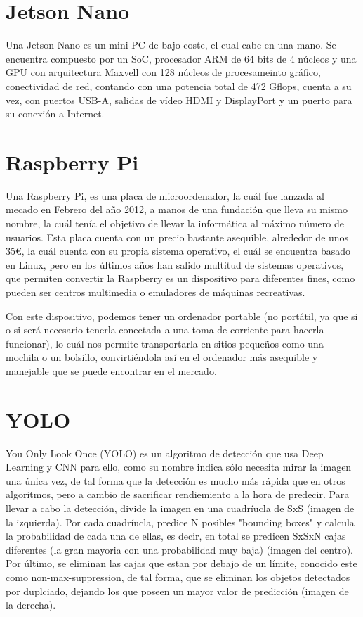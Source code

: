 
\section{Jetson Nano}

Una Jetson Nano \cite{jetsonNano} es un mini PC de bajo coste, el cual cabe en una mano. Se encuentra compuesto por un SoC, procesador ARM de 64 bits de 4 núcleos y una GPU con arquitectura Maxvell con 128 núcleos de procesameinto gráfico, conectividad de red, 
contando con una potencia total de 472 Gflops, cuenta a su vez, con puertos USB-A, salidas de vídeo HDMI y DisplayPort y un puerto para su conexión a Internet.


\section{Raspberry Pi}

Una Raspberry Pi, \cite{raspberry} es una placa de microordenador, la cuál fue lanzada al mecado en Febrero del año 2012, a manos de una fundación que lleva su mismo nombre, la cuál tenía el objetivo de llevar la informática al máximo número de usuarios.
Esta placa cuenta con un precio bastante asequible, alrededor de unos 35€, la cuál cuenta con su propia sistema operativo, el cuál se encuentra basado en Linux, pero en los últimos años han salido multitud de sistemas operativos, que permiten convertir 
la Raspberry es un dispositivo para diferentes fines, como pueden ser centros multimedia o emuladores de máquinas recreativas.

Con este dispositivo, podemos tener un ordenador portable (no portátil, ya que si o si será necesario tenerla conectada a una toma de corriente para hacerla funcionar), lo cuál nos permite transportarla en sitios pequeños como una mochila o un bolsillo,
convirtiéndola así en el ordenador más asequible y manejable que se puede encontrar en el mercado.


\section{YOLO}

You Only Look Once (YOLO) \cite{yolov4} es un algoritmo de detección que usa Deep Learning y CNN para ello, como su nombre indica sólo necesita mirar la imagen una única vez, de tal forma que la detección es mucho más rápida que en otros algoritmos, pero a cambio de sacrificar rendiemiento a la hora de predecir.
Para llevar a cabo la detección, divide la imagen en una cuadríucla de SxS (imagen de la izquierda). Por cada cuadríucla, predice N posibles "bounding boxes" y calcula la probabilidad de cada una de ellas, es decir, en total se predicen SxSxN cajas diferentes (la gran mayoria con una probabilidad muy baja) (imagen del centro). 
Por último, se eliminan las cajas que estan por debajo de un límite, conocido este como non-max-suppression, de tal forma, que se eliminan los objetos detectados por duplciado, dejando los que poseen un mayor valor de predicción (imagen de la derecha).


